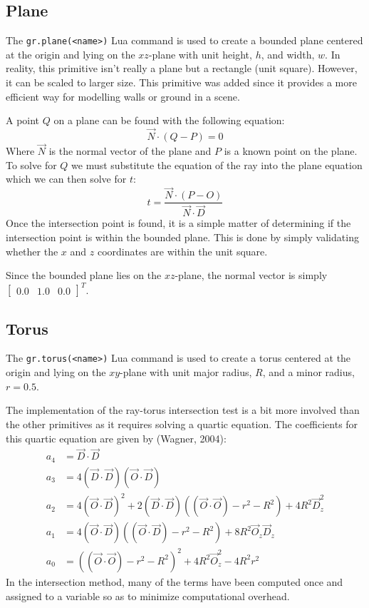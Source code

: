 \subsection*{Plane}
The \verb|gr.plane(<name>)| Lua command is used to create a bounded plane 
centered at the origin and lying on the $xz$-plane with unit height, $h$, and 
width, $w$. In reality, this primitive isn't really a plane but a rectangle
(unit square). However, it can be scaled to larger size. This primitive was
added since it provides a more efficient way for modelling walls or ground in a
scene.

A point $Q$ on a plane can be found with the following equation:
\begin{equation}
  \vec{N}\cdot (Q - P) = 0
\end{equation}
Where $\vec{N}$ is the normal vector of the plane and $P$ is a known point on
the plane. To solve for $Q$ we must substitute the equation of the ray into the
plane equation which we can then solve for $t$:
\begin{equation}
  t = \frac{\vec{N}\cdot (P - O)}{\vec{N}\cdot \vec{D}}
\end{equation}
Once the intersection point is found, it is a simple matter of determining if
the intersection point is within the bounded plane. This is done by simply
validating whether the $x$ and $z$ coordinates are within the unit square.

Since the bounded plane lies on the $xz$-plane, the normal vector is simply
$\begin{bmatrix} 0.0 & 1.0 & 0.0
\end{bmatrix}^{T}$.

\subsection*{Torus}
The \verb|gr.torus(<name>)| Lua command is used to create a torus centered at
the origin and lying on the $xy$-plane with unit major radius, $R$, and a minor 
radius, $r = 0.5$.

The implementation of the ray-torus intersection test is a bit more involved
than the other primitives as it requires solving a quartic equation. The
coefficients for this quartic equation are given by (Wagner, 2004):
\begin{equation}
\begin{split}
  a_{4} &= \vec{D}\cdot\vec{D} \\
  a_{3} &= 4(\vec{D}\cdot\vec{D})(\vec{O}\cdot\vec{D}) \\
  a_{2} &= 4(\vec{O}\cdot\vec{D})^2 + 2(\vec{D}\cdot\vec{D})((\vec{O}\cdot
  \vec{O}) - r^2 - R^2) + 4R^2\vec{D}_{z}^2 \\
  a_{1} &= 4(\vec{O}\cdot\vec{D})((\vec{O}\cdot\vec{D}) - r^2 - R^2) +8R^2
  \vec{O}_{z}\vec{D}_{z} \\
  a_{0} &= ((\vec{O}\cdot\vec{O}) - r^2 - R^2)^2 + 4R^2\vec{O}_{z}^2 - 4R^2r^2
\end{split}
\end{equation}
In the intersection method, many of the terms have been computed once and
assigned to a variable so as to minimize computational overhead.

